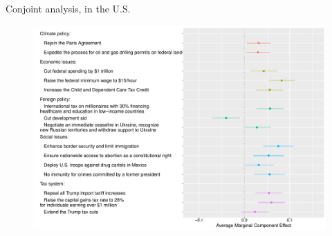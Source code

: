 \documentclass[aspectratio=169,xcolor=dvipsnames, 11pt,mathserif]{beamer}
\begin{document}
\begin{frame}{Conjoint analysis, in the U.S. \hyperlink{conjoint_countries}{}\label{conjoint_country}} 
    \begin{figure} \vspace{-.15cm}
\includegraphics[height=.97\textheight]{../figures/all/conjoint_EN.pdf}
\end{figure}
\end{frame}

\end{document}
